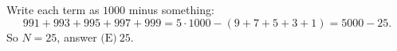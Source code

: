 Write each term as $1000$ minus something:
\[
991+993+995+997+999=5\cdot1000-(9+7+5+3+1)=5000-25 .
\]
So $N=25$, answer $\boxed{\text{(E)}\ 25}$.

